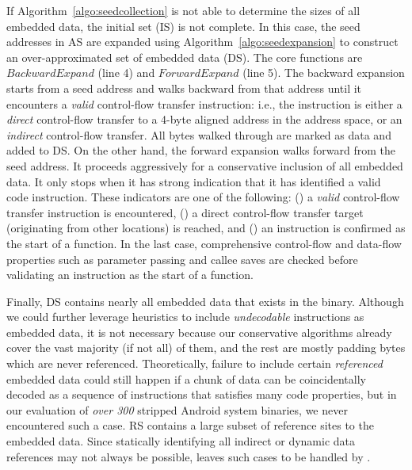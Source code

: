 %
%
%

If Algorithm~\ref{algo:seedcollection} is not able to determine the sizes of all embedded data, the initial set (IS) is not complete. In this case,
the seed addresses in AS are expanded using Algorithm~\ref{algo:seedexpansion} to construct an over-approximated set of embedded data (DS). The core 
functions are $BackwardExpand$ (line 4) and $ForwardExpand$ (line 5). The backward expansion starts from a seed address and walks backward from that address until it encounters a \emph{valid} control-flow transfer instruction: i.e., the instruction is 
either a \emph{direct} control-flow transfer to a 4-byte aligned address in the address space, or an \emph{indirect} control-flow transfer.
All bytes walked through are marked as data and added to DS. 
On the other hand, the forward expansion 
walks forward from the seed address. It proceeds aggressively for a conservative inclusion of all embedded data. It only stops when it has strong indication that it has identified a valid code instruction. These indicators are one of the following: () a \emph{valid} control-flow transfer instruction is encountered, () a direct control-flow transfer target (originating from other locations) is reached, and () an instruction is confirmed as the start of a function\cite{fia}.  In the last case, comprehensive control-flow and data-flow properties such as parameter passing and callee saves are checked before validating an instruction as the start of a function. 

Finally, DS contains nearly all embedded data that exists in the binary.
Although we could further leverage heuristics to include \emph{undecodable}
instructions as embedded data, it is not necessary because our conservative
algorithms already cover the vast majority (if not all) of them, and the
rest are mostly padding bytes which are never referenced. Theoretically,
failure to include certain \emph{referenced} embedded data could still happen
if a chunk of data can be coincidentally decoded as a sequence of instructions
that satisfies many code properties, but in our evaluation of \textit{over 300} stripped Android system binaries, we never encountered such a case.
RS contains a large subset of reference sites to the embedded data. Since
statically identifying all indirect or dynamic data references may not always
be possible, \NDisassembler leaves such cases to be handled by \NMonitor. 

